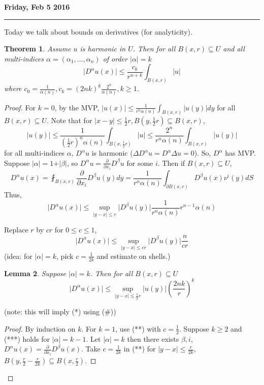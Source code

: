 \documentclass[11pt]{amsart}%
\newtheorem{theorem}{Theorem}
\newtheorem{lemma}[theorem]{Lemma}
\begin{document}
\textbf{Friday, Feb 5 2016}

\begin{center}\rule{0.5\linewidth}{\linethickness}\end{center}
Today we talk about bounds on derivatives (for analyticity).

\begin{theorem}
    Assume $u$ is harmonic in $U$. Then for all $B(x,r)\subseteq U$ and all multi-indices $\alpha=(\alpha_1,...,\alpha_n)$ of order $\vert \alpha\vert =k$
    \[\vert D^\alpha u(x)\vert \le \frac{c_k}{r^{n+k}}\int_{B(x,r)} \vert u\vert \tag{*}\]
    where $c_0=\frac{1}{\alpha(n)}, c_k=(2nk)^k\frac{2^n}{\alpha(n)}, k\ge 1$.
\end{theorem}

\begin{proof}
    For $k=0$, by the MVP, $\vert u(x)\vert \le \frac{1}{r^n\alpha(n)}\int_{B(x,r)}\vert u(y)\vert dy$ for all $B(x,r)\subseteq U$. Note that for $\vert x-y\vert\le \frac{1}{2}r, B(y,\frac{1}{2}r)\subseteq B(x,r)$,
    \[ \vert u(y)\vert \le\frac{1}{(\frac{1}{2}r)^n\alpha(n)}\int_{B(x,\frac{1}{2}r)}\vert u\vert \le \frac{2^n}{r^n\alpha(n)}\int_{B(x,r)} \vert u(y)\vert \tag{\#}\]
for all multi-indices $\alpha$, $D^\alpha u$ is harmonic ($\Delta D^\alpha u = D^\alpha \Delta u =0$). So, $D^\alpha$ has MVP. Suppose $\vert \alpha\vert =1+\vert \beta\vert$, so $D^\alpha u =\frac{\partial}{\partial x_i} D^\beta u$ for some $i$. Then if $B(x,r)\subseteq U$,
$$D^\alpha u(x) =\fint_{B(x,r)}\frac{\partial}{\partial x_i} D^\beta u(y)dy =\frac{1}{r^n\alpha(n)}\int_{\partial B(x,r)} D^\beta u(x)\nu^i(y) dS$$
Thus,
$$\vert D^\alpha u(x)\vert \le \sup_{\vert y-x\vert \le r} \vert D^\beta u(y)\vert \frac{1}{r^n\alpha(n)}r^{n-1}\alpha(n)$$

Replace $r$ by $cr$ for $0\le c\le 1$,
\[\vert D^\alpha u(x)\vert \le \sup_{\vert y-x\vert \le cr} \vert D^\beta u(y)\vert \frac{n}{cr} \tag{**}\]
(idea: for $\vert \alpha\vert =k$, pick $c=\frac{1}{2k}$ and estimate on shells.)

\begin{lemma}
    Suppose $\vert \alpha\vert =k$. Then for all $B(x,r)\subseteq U$
    \[\vert D^\alpha u(x)\vert \le \sup_{\vert y-x\vert \le\frac{1}{2}r} \vert u(y)\vert (\frac{2nk}{r})^k \tag{***}\]
\end{lemma}
(note: this will imply (*) using (\#))

\begin{proof}
    By induction on $k$. For $k=1$, use (**) with $c=\frac{1}{2}$. Suppose $k\ge2$ and (***) holds for $\vert \alpha \vert =k-1$. Let $\vert \alpha\vert =k$ then there exists $\beta, i$, $D^\alpha u(x) =\frac{\partial}{\partial x_i} D^\beta u(x)$. Take $c=\frac{1}{2k}$ in (**) for $\vert y-x\vert \le \frac{r}{2k}$, $B(y,\frac{r}{2}-\frac{r}{2k})\subseteq B(x,\frac{r}{2})$. 
    

\end{proof}
\end{proof}
\end{document}

